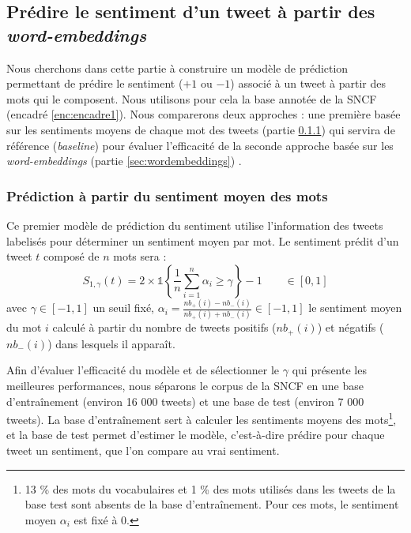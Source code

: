 \documentclass[11pt,french,french]{article}
\let\rmarkdownfootnote\footnote%
\def\footnote{\protect\rmarkdownfootnote}
\begin{document}
\hypertarget{pruxe9dire-le-sentiment-dun-tweet-uxe0-partir-des-word-embeddings}{%
\subsection{\texorpdfstring{Prédire le sentiment d'un tweet à partir des \emph{word-embeddings}}{Prédire le sentiment d'un tweet à partir des word-embeddings}}\label{pruxe9dire-le-sentiment-dun-tweet-uxe0-partir-des-word-embeddings}}

Nous cherchons dans cette partie à construire un modèle de prédiction permettant de prédire le sentiment (\(+1\) ou \(-1\)) associé à un tweet à partir des mots qui le composent.
Nous utilisons pour cela la base annotée de la SNCF (encadré \ref{enc:encadre1}).
Nous comparerons deux approches : une première basée sur les sentiments moyens de chaque mot des tweets (partie \ref{sec:sentiments}) qui servira de référence (\emph{baseline}) pour évaluer l'efficacité de la seconde approche basée sur les \emph{word-embeddings} (partie \ref{sec:wordembeddings}) .

\hypertarget{sec:sentiments}{%
\subsubsection{Prédiction à partir du sentiment moyen des mots}\label{sec:sentiments}}

Ce premier modèle de prédiction du sentiment utilise l'information des tweets labelisés pour déterminer un sentiment moyen par mot.
Le sentiment prédit d'un tweet \(t\) composé de \(n\) mots sera :
\[S_{1,\gamma}(t) = 2 \times \mathds{1}\left\{ \frac{1}{n} \sum \limits_{i=1}^n \alpha_i \geq \gamma\right\} - 1 \qquad \in [0,1]\]
avec \(\gamma \in [-1,1]\) un seuil fixé, \(\alpha_i = \frac{nb_+(i) - nb_-(i)}{nb_+(i) + nb_-(i)} \in [-1,1]\) le sentiment moyen du mot \(i\) calculé à partir du nombre de tweets positifs (\(nb_+(i)\)) et négatifs (\(nb_-(i)\)) dans lesquels il apparaît.

Afin d'évaluer l'efficacité du modèle et de sélectionner le \(\gamma\) qui présente les meilleures performances, nous séparons le corpus de la SNCF en une base d'entraînement (environ 16 000 tweets) et une base de test (environ 7 000 tweets). La base d'entraînement sert à calculer les sentiments moyens des mots\footnote{13 \% des mots du vocabulaires et 1 \% des mots utilisés dans les tweets de la base test sont absents de la base d'entraînement. Pour ces mots, le sentiment moyen \(\alpha_i\) est fixé à 0.}, et la base de test permet d'estimer le modèle, c'est-à-dire prédire pour chaque tweet un sentiment, que l'on compare au vrai sentiment.
\end{document}

